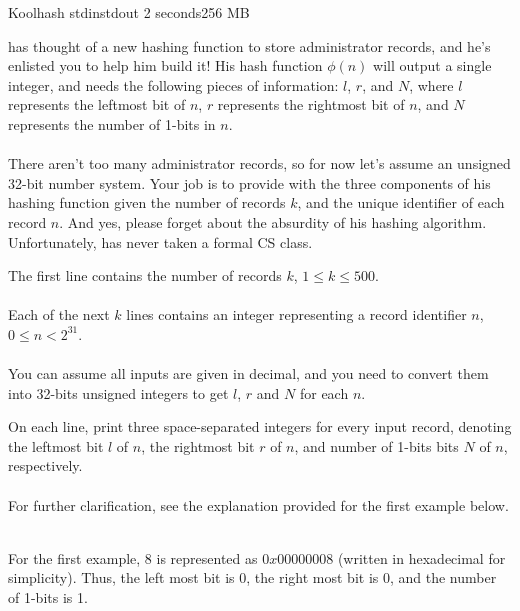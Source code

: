 \begin{problem}{Koolhash}
{stdin}{stdout}
{2 seconds}{256 MB}{}

\T has thought of a new hashing function to store administrator records, and he's enlisted you to help him build it! His hash function $\phi(n)$ will output a single integer, and needs the following pieces of information: $l$, $r$, and $N$, where $l$ represents the leftmost bit of  $n$, $r$ represents the rightmost bit of $n$, and $N$ represents the number of 1-bits in $n$. \\ \\
There aren't too many administrator records, so for now let's assume an unsigned 32-bit number system. Your job is to provide \T with the three components of his hashing function given the number of records $k$, and the unique identifier of each record $n$. And yes, please forget about the absurdity of his hashing algorithm. Unfortunately, \T has never taken a formal CS class.

\InputFile
The first line contains the number of records $k$, $1 \leq k \leq 500$. \\ \\
Each of the next $k$ lines contains an integer representing a record identifier $n$, $0 \leq n < 2^{31}$.\\ \\
You can assume all inputs are given in decimal, and you need to convert them into 32-bits unsigned integers to get $l$, $r$ and $N$ for each $n$.

\OutputFile
On each line, print three space-separated integers for every input record, denoting the leftmost bit $l$ of $n$, the rightmost bit $r$ of $n$, and number of 1-bits bits $N$ of $n$, respectively. \\ \\

For further clarification, see the explanation provided for the first example below.
\Examples

\begin{example}
%
\end{example}

\begin{example}
%
\end{example} \\
\Explanation
For the first example, $8$ is represented as $0x00000008$ (written in hexadecimal for simplicity). Thus, the left most bit is 0, the right most bit is 0, and the number of 1-bits is 1.
\end{problem}
